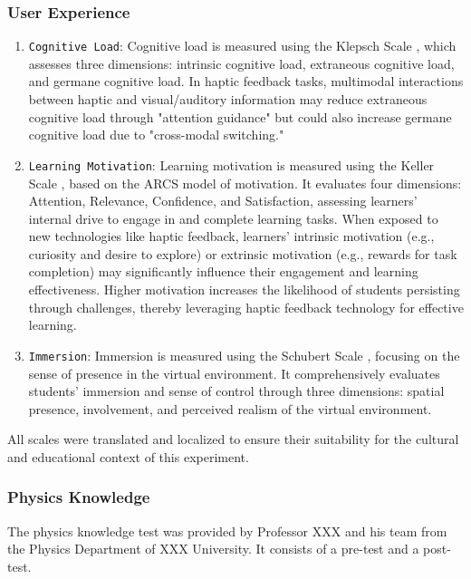\documentclass[runningheads]{llncs}
\begin{document}
\subsubsection{User Experience}
\begin{enumerate}
  \item {\texttt{Cognitive Load}}: Cognitive load is measured using the Klepsch Scale \cite{klepsch2017development}, which assesses three dimensions: intrinsic cognitive load, extraneous cognitive load, and germane cognitive load. In haptic feedback tasks, multimodal interactions between haptic and visual/auditory information may reduce extraneous cognitive load through "attention guidance" but could also increase germane cognitive load due to "cross-modal switching."

  \item {\texttt{Learning Motivation}}: Learning motivation is measured using the Keller Scale \cite{keller1983motivational}, based on the ARCS model of motivation. It evaluates four dimensions: Attention, Relevance, Confidence, and Satisfaction, assessing learners' internal drive to engage in and complete learning tasks. When exposed to new technologies like haptic feedback, learners' intrinsic motivation (e.g., curiosity and desire to explore) or extrinsic motivation (e.g., rewards for task completion) may significantly influence their engagement and learning effectiveness. Higher motivation increases the likelihood of students persisting through challenges, thereby leveraging haptic feedback technology for effective learning.

  \item {\texttt{Immersion}}: Immersion is measured using the Schubert Scale \cite{schubert2001experience}, focusing on the sense of presence in the virtual environment. It comprehensively evaluates students' immersion and sense of control through three dimensions: spatial presence, involvement, and perceived realism of the virtual environment.
\end{enumerate}

All scales were translated and localized to ensure their suitability for the cultural and educational context of this experiment.

\subsubsection{Physics Knowledge}
The physics knowledge test was provided by Professor XXX
and his team from the Physics Department of XXX
University. It consists of a pre-test and a post-test.
\end{document}
